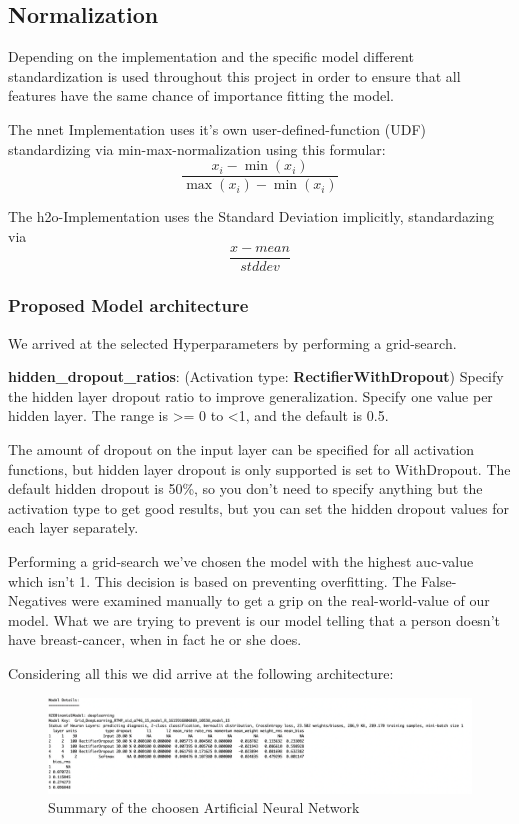 \documentclass[]{article}
\begin{document}
\subsection{Normalization}\label{normalization}

Depending on the implementation and the specific model different
standardization is used throughout this project in order to ensure that
all features have the same chance of importance fitting the model.

The nnet Implementation uses it's own user-defined-function (UDF)
standardizing via min-max-normalization using this formular: \[
\frac{x_i-\min(x_i)}{\max(x_i)-\min(x_i)}
\]

The h2o-Implementation uses the Standard Deviation implicitly,
standardazing via \[
\frac{x-mean}{stddev}
\]

\subsubsection{Proposed Model
architecture}\label{proposed-model-architecture}

We arrived at the selected Hyperparameters by performing a grid-search.

\textbf{hidden\_dropout\_ratios}: (Activation type:
\textbf{RectifierWithDropout}) Specify the hidden layer dropout ratio to
improve generalization. Specify one value per hidden layer. The range is
\textgreater{}= 0 to \textless{}1, and the default is 0.5.

The amount of dropout on the input layer can be specified for all
activation functions, but hidden layer dropout is only supported is set
to WithDropout. The default hidden dropout is 50\%, so you don't need to
specify anything but the activation type to get good results, but you
can set the hidden dropout values for each layer separately.

Performing a grid-search we've chosen the model with the highest
auc-value which isn't 1. This decision is based on preventing
overfitting. The False-Negatives were examined manually to get a grip on
the real-world-value of our model. What we are trying to prevent is our
model telling that a person doesn't have breast-cancer, when in fact he
or she does.

Considering all this we did arrive at the following architecture:

\begin{figure}
    \centering
    \includegraphics[width=1\textwidth]{images/model_details.png}
    \caption{Summary of the choosen Artificial Neural Network}
    \label{fig:model_details}
\end{figure}
\end{document}
